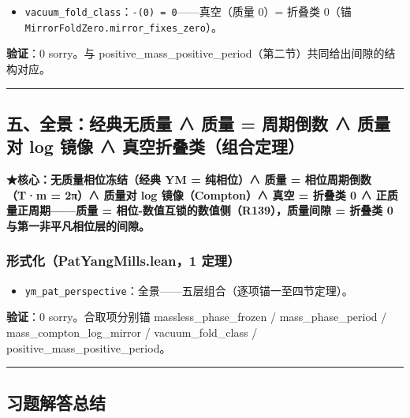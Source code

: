 \documentclass[
]{article}
\providecommand{\tightlist}{%
 \setlength{\itemsep}{0pt}\setlength{\parskip}{0pt}}
\begin{document}
\begin{itemize}
\tightlist
\item
 \texttt{vacuum\_fold\_class}：\texttt{-(0)\ =\ 0}------真空（质量 0）=
 折叠类 0（锚 \texttt{MirrorFoldZero.mirror\_fixes\_zero}）。
\end{itemize}

\textbf{验证}：0 sorry。与
positive\_mass\_positive\_period（第二节）共同给出间隙的结构对应。

\begin{center}\rule{0.5\linewidth}{0.5pt}\end{center}

\subsection{五、全景：经典无质量 ∧ 质量 = 周期倒数 ∧ 质量对 log 镜像 ∧
真空折叠类（组合定理）}\label{ux4e94ux5168ux666fux7ecfux5178ux65e0ux8d28ux91cf-ux8d28ux91cf-ux5468ux671fux5012ux6570-ux8d28ux91cfux5bf9-log-ux955cux50cf-ux771fux7a7aux6298ux53e0ux7c7bux7ec4ux5408ux5b9aux7406}

\textbf{★核心：无质量相位冻结（经典 YM = 纯相位）∧ 质量 =
相位周期倒数（T·m = 2π）∧ 质量对 log 镜像（Compton）∧ 真空 = 折叠类 0 ∧
正质量正周期------质量 = 相位-数值互锁的数值侧（R139），质量间隙 =
折叠类 0 与第一非平凡相位层的间隙。}

\subsubsection{形式化（PatYangMills.lean，1
定理）}\label{ux5f62ux5f0fux5316patyangmills.lean1-ux5b9aux7406-3}

\begin{itemize}
\tightlist
\item
 \texttt{ym\_pat\_perspective}：全景------五层组合（逐项锚一至四节定理）。
\end{itemize}

\textbf{验证}：0 sorry。合取项分别锚 massless\_phase\_frozen /
mass\_phase\_period / mass\_compton\_log\_mirror / vacuum\_fold\_class /
positive\_mass\_positive\_period。

\begin{center}\rule{0.5\linewidth}{0.5pt}\end{center}

\subsection{习题解答总结}\label{ux4e60ux9898ux89e3ux7b54ux603bux7ed3}
\end{document}
